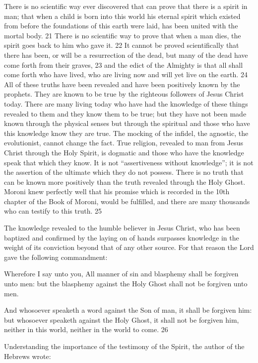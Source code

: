 There is no scientific way ever discovered that can prove that there is a spirit in man; that
when a child is born into this world his eternal spirit which existed from before the
foundations of this earth were laid, has been united with the mortal body. 21 There is no
scientific way to prove that when a man dies, the spirit goes back to him who gave it. 22 It
cannot be proved scientifically that there has been, or will be a resurrection of the dead, but
many of the dead have come forth from their graves, 23 and the edict of the Almighty is that
all shall come forth who have lived, who are living now and will yet live on the earth. 24 All
of these truths have been revealed and have been positively known by the prophets. They are
known to be true by the righteous followers of Jesus Christ today. There are many living
today who have had the knowledge of these things revealed to them and they know them to
be true; but they have not been made known through the physical senses but through the
spiritual and those who have this knowledge know they are true. The mocking of the infidel,
the agnostic, the evolutionist, cannot change the fact. True religion, revealed to man from
Jesus Christ through the Holy Spirit, is dogmatic and those who have the knowledge speak
that which they know. It is not ``assertiveness without knowledge''; it is not the assertion of
the ultimate which they do not possess. There is no truth that can be known more positively
than the truth revealed through the Holy Ghost. Moroni knew perfectly well that his promise
which is recorded in the 10th chapter of the Book of Moroni, would be fulfilled, and there are
many thousands who can testify to this truth. 25

The knowledge revealed to the humble believer in Jesus Christ, who has been baptized and
confirmed by the laying on of hands surpasses knowledge in the weight of its conviction
beyond that of any other source. For that reason the Lord gave the following commandment:

Wherefore I say unto you, All manner of sin and blasphemy shall be forgiven unto men: but
the blasphemy against the Holy Ghost shall not be forgiven unto men.

And whosoever speaketh a word against the Son of man, it shall be forgiven him: but
whosoever speaketh against the Holy Ghost, it shall not be forgiven him, neither in this
world, neither in the world to come. 26

Understanding the importance of the testimony of the Spirit, the author of the Hebrews
wrote:

